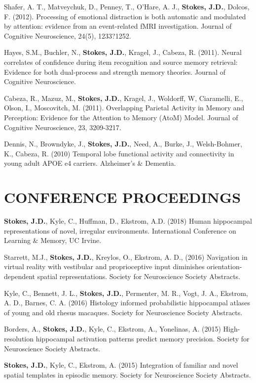 \documentclass[line,margin,10pt]{res}
\begin{document}
\begin{resume}
Shafer, A. T., Matveychuk, D., Penney, T., O'Hare, A. J., \textbf{Stokes, J.D.}, Dolcos, F. (2012). Processing of emotional distraction is both automatic and modulated by attention: evidence from an event-related fMRI investigation. Journal of Cognitive Neuroscience, 24(5), 1233?1252.
 		
Hayes, S.M., Buchler, N., \textbf{Stokes, J.D.}, Kragel, J., Cabeza, R. (2011). Neural correlates of confidence during item recognition and source memory retrieval: Evidence for both dual-process and strength memory theories. Journal of Cognitive Neuroscience.
	
Cabeza, R., Mazuz, M., \textbf{Stokes, J.D.}, Kragel, J., Woldorff, W, Ciaramelli, E., Olson, I., Moscovitch, M. (2011). Overlapping Parietal Activity in Memory and Perception: Evidence for the Attention to Memory (AtoM) Model. Journal of Cognitive Neuroscience, 23, 3209-3217.
	
Dennis, N., Browndyke, J., \textbf{Stokes, J.D.}, Need, A., Burke, J., Welsh-Bohmer, K., Cabeza, R. (2010) Temporal lobe functional activity and connectivity in young adult APOE e4 carriers. Alzheimer's \& Dementia.

\section{CONFERENCE PROCEEDINGS} 

\textbf{Stokes, J.D.}, Kyle, C., Huffman, D., Ekstrom, A.D. (2018) Human hippocampal representations of novel, irregular environments. International Conference on Learning \& Memory, UC Irvine.

Starrett, M.J., \textbf{Stokes, J.D.}, Kreylos, O., Ekstrom, A. D., (2016) Navigation in virtual reality with vestibular and proprioceptive input diminishes orientation-dependent spatial representations. Society for Neuroscience Society Abstracts.

Kyle, C., Bennett, J. L., \textbf{Stokes, J.D.}, Permenter, M. R., Vogt, J. A., Ekstrom, A. D., Barnes, C. A. (2016) Histology informed probabilistic hippocampal atlases of young and old rhesus macaques. Society for Neuroscience Society Abstracts.

Borders, A., \textbf{Stokes, J.D.}, Kyle, C., Ekstrom, A., Yonelinas, A. (2015) High-resolution hippocampal activation patterns predict memory precision. Society for Neuroscience Society Abstracts.

\textbf{Stokes, J.D.}, Kyle, C., Ekstrom, A. (2015) Integration of familiar and novel spatial templates in episodic memory. Society for Neuroscience Society Abstracts.


\end{resume}
\end{document}
